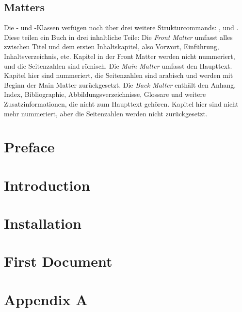 \section{Matters}
Die - und -Klassen verfügen noch über drei weitere Strukturcommands: ,  und .
Diese teilen ein Buch in drei inhaltliche Teile:
Die \emph{Front Matter} umfasst alles zwischen Titel und dem ersten Inhaltskapitel, also Vorwort, Einführung, Inhaltsverzeichnis, etc.
Kapitel in der Front Matter werden nicht nummeriert, und die Seitenzahlen sind römisch.
Die \emph{Main Matter} umfasst den Haupttext.
Kapitel hier sind nummeriert, die Seitenzahlen sind arabisch und werden mit Beginn der Main Matter zurückgesetzt.
Die \emph{Back Matter} enthält den Anhang, Index, Bibliographie, Abbildungsverzeichnisse, Glossare und weitere Zusatzinformationen, die nicht zum Haupttext gehören.
Kapitel hier sind nicht mehr nummeriert, aber die Seitenzahlen werden nicht zurückgesetzt.
\begin{latexlisting}
	\maketitle
	\frontmatter
	\chapter{Preface}
	\blindtext[4]

	\clearpage
	\tableofcontents
	\clearpage

	\chapter{Introduction}
	\blindtext[2]

	\mainmatter

	\chapter{Installation}
	\blindtext[10]

	\chapter{First Document}
	\blindtext[10]

	\backmatter
	\chapter{Appendix A}
	\blindtext[5]
\end{latexlisting}

